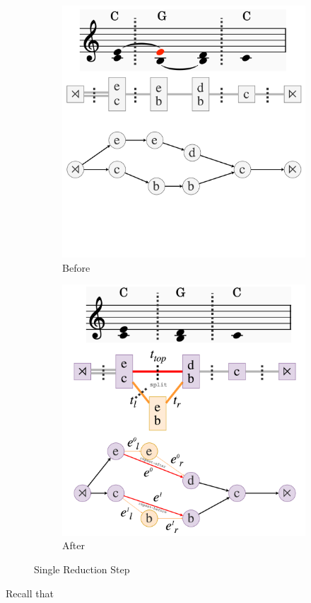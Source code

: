 \documentclass[12pt,a4paper,twoside,openright]{report} \usepackage[pdfborder={0 0 0}]{hyperref}    %
\theoremstyle{definition} \newtheorem{definition}{Definition}[section]
\begin{document}
  \begin{figure}[h] \centering \begin{subfigure}[t]{.49\textwidth}
    \centering\includegraphics[keepaspectratio,width=\textwidth]{impl/reduction/before.png} \caption{Before}
    \label{fig:reductionBefore} \end{subfigure} \begin{subfigure}[t]{.49\textwidth}
    \centering\includegraphics[keepaspectratio,width=\textwidth]{impl/reduction/after.png} \caption{After}
    \label{fig:reductionAfter} \end{subfigure}

  \captionsetup{width=.9\linewidth} \caption{Single Reduction Step} \label{fig:reductionStep} \end{figure} Recall that
\end{document}
